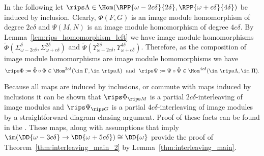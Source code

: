 In the following let $\rips\Lambda\in\Hom(\RPP{\omega-2c\delta}{2\delta},\RPP{\omega+c\delta}{4\delta})$ be induced by inclusion.
Clearly, $\Phi(F, G)$ is an image module homomorphism of degree $2c\delta$ and $\Psi(M, N)$ is an image module homomorphism of degree $4c\delta$.
By Lemma~\ref{lem:rips_homomorphism_left} we have image module homomorphisms $\tilde{\Phi}(\Sigma_{\omega-2c\delta}^\delta, \Sigma_{\omega+c\delta}^{2\delta})$ and $\tilde{\Psi}(\Upsilon_{\omega-2c\delta}^{2\delta}, \Upsilon_{\omega+c\delta}^{4\delta})$.
Therefore, as the composition of image module homomorphisms are image module homomorphisms we have
\[ \rips\Phi := \tilde{\Phi}\circ\Phi\in\Hom^{2c\delta}(\im~\Gamma,\im~\rips\Lambda)\ \text{ and }\ \rips\Psi :=\Psi\circ\tilde{\Psi}\in\Hom^{4c\delta}(\im~\rips\Lambda, \im~\Pi).\]

Because all maps are induced by inclusions, or commute with maps induced by inclusions it can be shown that $\rips \Phi_{\rips M}$ is a partial $2c\delta$-interleaving of image modules and $\rips \Psi_{\rips G}$ is a partial $4c\delta$-interleaving of image modules by a straightforward diagram chasing argument.
Proof of these facts can be found in the \fullversion.
These maps, along with assumptions that imply $\im(\DD{\omega-3c\delta}\to \DD{\omega+5c\delta})\cong \DD{\omega}$ provide the proof of Theorem~\ref{thm:interleaving_main_2} by Lemma~\ref{thm:interleaving_main}.

